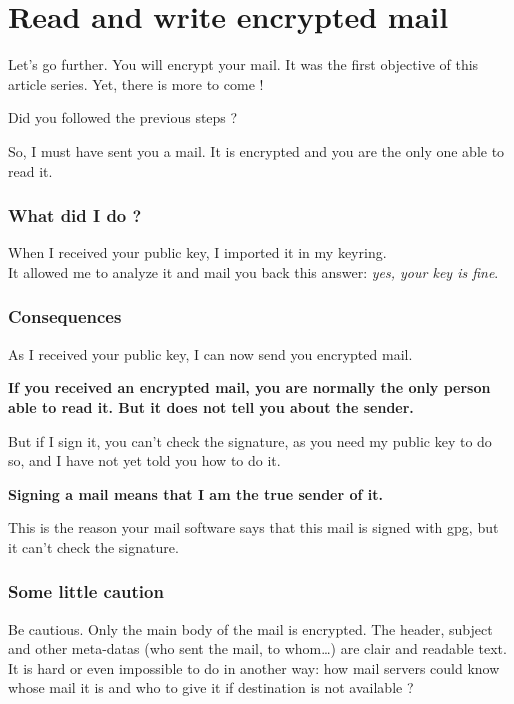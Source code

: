 \chapter{Read and write encrypted mail}

Let's go further. You will encrypt your mail. It was the first objective
of this article series. Yet, there is more to come !

Did you followed the previous steps ?

So, I must have sent you a mail. It is encrypted and you are the only
one able to read it.

\subsection{What did I do ?}\label{what-did-i-do}

When I received your public key, I imported it in my keyring.\\It
allowed me to analyze it and mail you back this answer: \emph{yes, your
key is fine}.

\subsection{Consequences}\label{consequences}

As I received your public key, I can now send you encrypted mail.

\textbf{If you received an encrypted mail, you are normally the only
person able to read it. But it does not tell you about the sender.}

But if I sign it, you can't check the signature, as you need my public
key to do so, and I have not yet told you how to do it.

\textbf{Signing a mail means that I am the true sender of it.}

This is the reason your mail software says that this mail is signed with
gpg, but it can't check the signature.

\subsection{Some little caution}\label{some-little-caution}

Be cautious. Only the main body of the mail is encrypted. The header,
subject and other meta-datas (who sent the mail, to whom\ldots{}) are
clair and readable text. It is hard or even impossible to do in another
way: how mail servers could know whose mail it is and who to give it if
destination is not available ?

